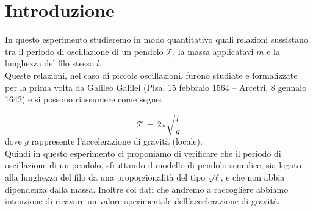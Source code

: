 \section{Introduzione}


In questo esperimento studieremo in modo quantitativo quali relazioni sussistano tra il periodo di oscillazione di un pendolo $\mathcal{T}$, la massa applicatavi $m$ e la lunghezza del filo stesso $l$.\\
Queste relazioni, nel caso di piccole oscillazioni, furono studiate e formalizzate per la prima volta da Galileo Galilei (Pisa, 15 febbraio 1564 – Arcetri, 8 gennaio 1642) e si possono riassumere come segue:

\begin{equation}
    \label{eq:periodo_pendolo}
	\mathcal{T} \,=\, 2\pi\sqrt{\frac{l}{g}}
\end{equation}
%
dove $g$ rappresente l'accelerazione di gravità (locale).\\
Quindi in questo esperimento ci proponiamo di verificare che il periodo di oscillazione di un pendolo,
sfruttando il modello di pendolo semplice, sia legato alla lunghezza del filo da una proporzionalità del tipo $\sqrt{\ell}$,
e che non abbia dipendenza dalla massa.
Inoltre coi dati che andremo a raccogliere abbiamo intenzione di ricavare un valore sperimentale dell'accelerazione di gravità.
